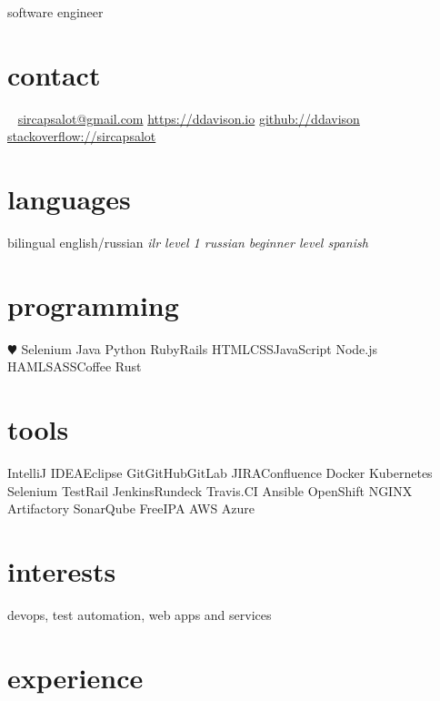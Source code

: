 \documentclass[]{ddavison-resume}
\begin{document}
       {software engineer}


\begin{aside}
  \section{contact}
    ~
    \href{mailto:sircapsalot@gmail.com}{sircapsalot@gmail.com}
    \href{https://ddavison.io}{https://ddavison.io}
    \href{https://github.com/ddavison}{github://ddavison}
    \href{https://stackoverflow.com/users/1695163/sircapsalot}{stackoverflow://sircapsalot}
  \section{languages}
    bilingual english/russian
	\emph{ilr level 1 russian}
	\emph{beginner level spanish}
  \section{programming}
    {\color{red} $\varheartsuit$} Selenium
	Java     
    Python
    Ruby\bullet Rails
    HTML\bullet CSS\bullet JavaScript
    Node.js
    HAML\bullet SASS\bullet Coffee
    Rust
  \section{tools}
	IntelliJ IDEA\bullet Eclipse  	
	Git\bullet GitHub\bullet GitLab	
  	JIRA\bullet Confluence
  	Docker
  	Kubernetes
  	Selenium
  	TestRail
  	Jenkins\bullet Rundeck
  	Travis.CI
  	Ansible
  	OpenShift
  	NGINX
  	Artifactory
  	SonarQube
  	FreeIPA
    AWS
    Azure
\end{aside}

\section{interests}

devops, test automation, web apps and services

\section{experience}
\end{document}
